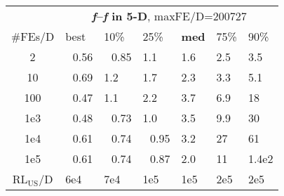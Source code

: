 \begin{tabular}{c|llllll}
 & \multicolumn{6}{|c}{\textbf{\textit{f}\raisebox{-0.35ex}{1}--\textit{f}\raisebox{-0.35ex}{24} in 5-D}, maxFE/D=200727}\\
\#FEs/D & best & 10\% & 25\% & \textbf{med} & 75\% & 90\%\\
2 & ~\,0.56 & ~\,0.85 & \hspace*{1ex}1.1 & \hspace*{1ex}1.6 & \hspace*{1ex}2.5 & \hspace*{1ex}3.5\\
10 & ~\,0.69 & \hspace*{1ex}1.2 & \hspace*{1ex}1.7 & \hspace*{1ex}2.3 & \hspace*{1ex}3.3 & \hspace*{1ex}5.1\\
100 & ~\,0.47 & \hspace*{1ex}1.1 & \hspace*{1ex}2.2 & \hspace*{1ex}3.7 & \hspace*{1ex}6.9 & 18\\
1e3 & ~\,0.48 & ~\,0.73 & \hspace*{1ex}1.0 & \hspace*{1ex}3.5 & \hspace*{1ex}9.9 & 30\\
1e4 & ~\,0.61 & ~\,0.74 & ~\,0.95 & \hspace*{1ex}3.2 & 27 & 61\\
1e5 & ~\,0.61 & ~\,0.74 & ~\,0.87 & \hspace*{1ex}2.0 & 11 & 1.4e2\\
$\text{RL}_{\text{US}}$/D & 6e4 & 7e4 & 1e5 & 1e5 & 2e5 & 2e5
\end{tabular}

